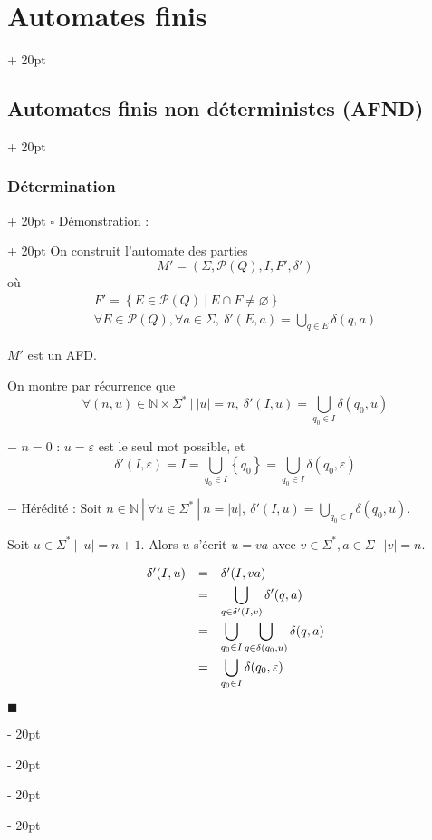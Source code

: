 \documentclass[a4paper, 12pt, twoside]{article}
\newcommand{\N}{\mathbb{N}} %
\newcommand{\set}[1]{\left\{ #1 \right\}}
\newcommand{\abs}[1]{\left\lvert #1 \right\rvert}
\newcommand{\ind}[1][20pt]{\advance\leftskip + #1}
\newcommand{\deind}[1][20pt]{\advance\leftskip - #1}
\newenvironment{indt}[2][20pt]{#2 \par \ind[#1]}{\par \deind} %
\newenvironment{proof}[1][{Démonstration :}]{\begin{indt}{$\square$ #1}}{$\blacksquare$ \end{indt}}
\begin{document}
\begin{indt}{\section{Automates finis}}
\begin{indt}{\subsection{Automates finis non déterministes (AFND)}}
\begin{indt}{\subsubsection{Détermination}}
\begin{proof}
                    \boxed{\Leftarrow} On construit l'automate des parties
                    \[
                        M' = (\Sigma, \mathcal P(Q), I, F', \delta')
                    \]
                    où
                    \[
                        \begin{array}{l}
                            F' = \set{E \in \mathcal P(Q) \ |\ E \cap F \neq \varnothing}
                            \\
                            \forall E \in \mathcal P(Q), \forall a \in \Sigma,\
                            \delta'(E, a) = \displaystyle \bigcup_{q \in E} \delta(q, a)
                        \end{array}
                    \]

                    $M'$ est un AFD.

                    On montre par récurrence que
                    \[
                        \forall (n, u) \in \N \times \Sigma^*\ |\ \abs u = n,\
                        \delta'(I, u) = \bigcup_{q_0 \in I} \delta(q_0, u)
                    \]

                    $-$ $n = 0$ : $u = \varepsilon$ est le seul mot possible, et
                    \[
                        \delta'(I, \varepsilon) = I = \bigcup_{q_0 \in I} \set{q_0} = \bigcup_{q_0 \in I} \delta(q_0, \varepsilon)
                    \]

                    $-$ Hérédité : Soit $n \in \N\ |\ \forall u \in \Sigma^*\ |\ n = \abs u,\ \delta'(I, u) = \displaystyle \bigcup_{q_0 \in I} \delta (q_0, u)$.

                    Soit $u \in \Sigma^*\ |\ \abs u = n + 1$. Alors $u$ s'écrit $u = va$ avec $v \in \Sigma^*, a \in \Sigma\ |\ \abs v = n$.

                    \[
                        \begin{array}{rcl}
                            \delta'(I, u)
                            &=& \delta'(I, va)
                            \vspace{3pt}
                            \\
                            &=& \displaystyle \bigcup_{q \in \delta'(I, v)} \delta'(q, a)
                            \vspace{3pt}
                            \\
                            &=& \displaystyle \bigcup_{q_0 \in I} \bigcup_{q \in \delta(q_0, u)} \delta(q, a)
                            \vspace{3pt}
                            \\
                            &=& \displaystyle \bigcup_{q_0 \in I} \delta(q_0, \varepsilon)
                        \end{array}
                    \]


\end{proof}
\end{indt}
\end{indt}
\end{indt}
\end{document}
